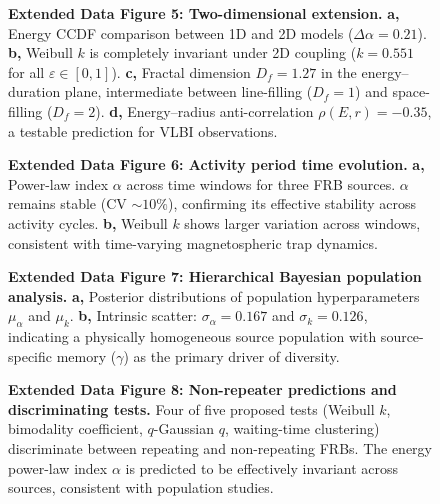 \documentclass[twocolumn]{article}
\begin{document}
\begin{figure}[!ht]
\centering
\caption{\textbf{Extended Data Figure 5: Two-dimensional extension.}
\textbf{a,} Energy CCDF comparison between 1D and 2D models ($\Delta\alpha = 0.21$).
\textbf{b,} Weibull $k$ is completely invariant under 2D coupling ($k = 0.551$ for all $\varepsilon \in [0, 1]$).
\textbf{c,} Fractal dimension $D_f = 1.27$ in the energy--duration plane, intermediate between line-filling ($D_f = 1$) and space-filling ($D_f = 2$).
\textbf{d,} Energy--radius anti-correlation $\rho(E, r) = -0.35$, a testable prediction for VLBI observations.}
\label{fig:ed5}
\end{figure}

\begin{figure}[!ht]
\centering
\caption{\textbf{Extended Data Figure 6: Activity period time evolution.}
\textbf{a,} Power-law index $\alpha$ across time windows for three FRB sources. $\alpha$ remains stable (CV $\sim 10\%$), confirming its effective stability across activity cycles.
\textbf{b,} Weibull $k$ shows larger variation across windows, consistent with time-varying magnetospheric trap dynamics.}
\label{fig:ed6}
\end{figure}

\begin{figure}[!ht]
\centering
\caption{\textbf{Extended Data Figure 7: Hierarchical Bayesian population analysis.}
\textbf{a,} Posterior distributions of population hyperparameters $\mu_\alpha$ and $\mu_k$.
\textbf{b,} Intrinsic scatter: $\sigma_\alpha = 0.167$ and $\sigma_k = 0.126$, indicating a physically homogeneous source population with source-specific memory ($\gamma$) as the primary driver of diversity.}
\label{fig:ed7}
\end{figure}

\begin{figure}[!ht]
\centering
\caption{\textbf{Extended Data Figure 8: Non-repeater predictions and discriminating tests.}
Four of five proposed tests (Weibull $k$, bimodality coefficient, $q$-Gaussian $q$, waiting-time clustering) discriminate between repeating and non-repeating FRBs. The energy power-law index $\alpha$ is predicted to be effectively invariant across sources, consistent with population studies\cite{hashimoto2022}.}
\label{fig:ed8}
\end{figure}
\end{document}
